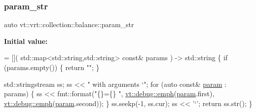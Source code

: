 \subsubsection{\texorpdfstring{param\+\_\+str}{param\_str}}
{\footnotesize\ttfamily auto vt\+::vrt\+::collection\+::balance\+::param\+\_\+str}

{\bfseries Initial value\+:}
\begin{DoxyCode}
= [](
  std::map<std::string,std::string> \textcolor{keyword}{const}& params
) -> std::string \{
  \textcolor{keywordflow}{if} (params.empty()) \{
    \textcolor{keywordflow}{return} \textcolor{stringliteral}{""};
  \}

  std::stringstream ss;
  ss << \textcolor{stringliteral}{" with arguments `"};
  \textcolor{keywordflow}{for} (\textcolor{keyword}{auto} \textcolor{keyword}{const}& \hyperlink{namespacevt_1_1config_a6bd1d6215bda0d8ca02811798399f689ab9f079503fc8bbc11679d6dd6d2a2d16}{param} : params) \{
    ss << fmt::format(\textcolor{stringliteral}{"\{\}=\{\} "},
      \hyperlink{namespacevt_1_1debug_add365336d7aa2053b5b7588ccad48ac7}{vt::debug::emph}(\hyperlink{namespacevt_1_1config_a6bd1d6215bda0d8ca02811798399f689ab9f079503fc8bbc11679d6dd6d2a2d16}{param}.first),
      \hyperlink{namespacevt_1_1debug_add365336d7aa2053b5b7588ccad48ac7}{vt::debug::emph}(\hyperlink{namespacevt_1_1config_a6bd1d6215bda0d8ca02811798399f689ab9f079503fc8bbc11679d6dd6d2a2d16}{param}.second));
  \}
  ss.seekp(-1, ss.cur);
  ss << \textcolor{charliteral}{'`'};
  \textcolor{keywordflow}{return} ss.str();
\}
\end{DoxyCode}
